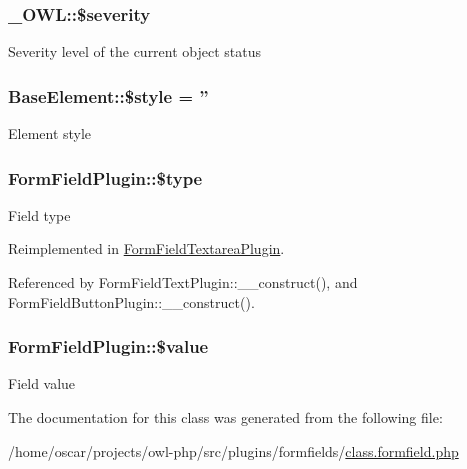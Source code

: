 \subsubsection[{\$severity}]{\setlength{\rightskip}{0pt plus 5cm}\_\-OWL::\$severity}\label{class__OWL_ad26b40a9dbbacb33e299b17826f8327c}
Severity level of the current object status 
\subsubsection[{\$style}]{\setlength{\rightskip}{0pt plus 5cm}BaseElement::\$style = ''}\label{classBaseElement_a429a3d642dd95f30e1059ef29564b87d}
Element style 
\subsubsection[{\$type}]{\setlength{\rightskip}{0pt plus 5cm}FormFieldPlugin::\$type}\label{classFormFieldPlugin_acf8210731f7b8dcee47d777975bc91ca}
Field type 

Reimplemented in \hyperlink{classFormFieldTextareaPlugin_af23729f44357a182a2b25a2689fca464}{FormFieldTextareaPlugin}.



Referenced by FormFieldTextPlugin::\_\-\_\-construct(), and FormFieldButtonPlugin::\_\-\_\-construct().

\subsubsection[{\$value}]{\setlength{\rightskip}{0pt plus 5cm}FormFieldPlugin::\$value}\label{classFormFieldPlugin_abbe128149202f43e8fcac8184018048c}
Field value 

The documentation for this class was generated from the following file:\begin{DoxyCompactItemize}
\item 
/home/oscar/projects/owl-\/php/src/plugins/formfields/\hyperlink{class_8formfield_8php}{class.formfield.php}\end{DoxyCompactItemize}
